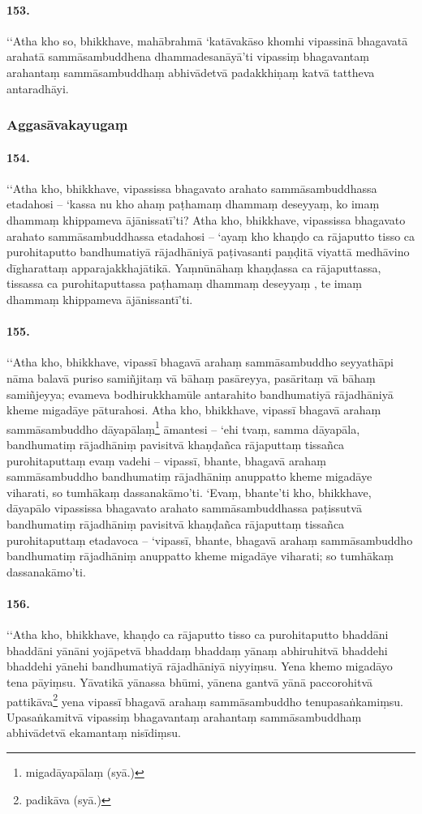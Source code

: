 \paragraph{153.} ‘‘Atha kho so, bhikkhave, mahābrahmā ‘katāvakāso khomhi vipassinā bhagavatā arahatā sammāsambuddhena dhammadesanāyā’ti vipassiṃ bhagavantaṃ arahantaṃ sammāsambuddhaṃ abhivādetvā padakkhiṇaṃ katvā tattheva antaradhāyi.

\subsubsection{Aggasāvakayugaṃ}

\paragraph{154.} ‘‘Atha kho, bhikkhave, vipassissa bhagavato arahato sammāsambuddhassa etadahosi – ‘kassa nu kho ahaṃ paṭhamaṃ dhammaṃ deseyyaṃ, ko imaṃ dhammaṃ khippameva ājānissatī’ti? Atha kho, bhikkhave, vipassissa bhagavato arahato sammāsambuddhassa etadahosi – ‘ayaṃ kho khaṇḍo ca rājaputto tisso ca purohitaputto bandhumatiyā rājadhāniyā paṭivasanti paṇḍitā viyattā medhāvino dīgharattaṃ apparajakkhajātikā. Yaṃnūnāhaṃ khaṇḍassa ca rājaputtassa, tissassa ca purohitaputtassa paṭhamaṃ dhammaṃ deseyyaṃ , te imaṃ dhammaṃ khippameva ājānissantī’ti.

\paragraph{155.} ‘‘Atha kho, bhikkhave, vipassī bhagavā arahaṃ sammāsambuddho seyyathāpi nāma balavā puriso samiñjitaṃ vā bāhaṃ pasāreyya, pasāritaṃ vā bāhaṃ samiñjeyya; evameva bodhirukkhamūle antarahito bandhumatiyā rājadhāniyā kheme migadāye pāturahosi. Atha kho, bhikkhave, vipassī bhagavā arahaṃ sammāsambuddho dāyapālaṃ\footnote{migadāyapālaṃ (syā.)} āmantesi – ‘ehi tvaṃ, samma dāyapāla, bandhumatiṃ rājadhāniṃ pavisitvā khaṇḍañca rājaputtaṃ tissañca purohitaputtaṃ evaṃ vadehi – vipassī, bhante, bhagavā arahaṃ sammāsambuddho bandhumatiṃ rājadhāniṃ anuppatto kheme migadāye viharati, so tumhākaṃ dassanakāmo’ti. ‘Evaṃ, bhante’ti kho, bhikkhave, dāyapālo vipassissa bhagavato arahato sammāsambuddhassa paṭissutvā bandhumatiṃ rājadhāniṃ pavisitvā khaṇḍañca rājaputtaṃ tissañca purohitaputtaṃ etadavoca – ‘vipassī, bhante, bhagavā arahaṃ sammāsambuddho bandhumatiṃ rājadhāniṃ anuppatto kheme migadāye viharati; so tumhākaṃ dassanakāmo’ti.

\paragraph{156.} ‘‘Atha kho, bhikkhave, khaṇḍo ca rājaputto tisso ca purohitaputto bhaddāni bhaddāni yānāni yojāpetvā bhaddaṃ bhaddaṃ yānaṃ abhiruhitvā bhaddehi bhaddehi yānehi bandhumatiyā rājadhāniyā niyyiṃsu. Yena khemo migadāyo tena pāyiṃsu. Yāvatikā yānassa bhūmi, yānena gantvā yānā paccorohitvā pattikāva\footnote{padikāva (syā.)} yena vipassī bhagavā arahaṃ sammāsambuddho tenupasaṅkamiṃsu. Upasaṅkamitvā vipassiṃ bhagavantaṃ arahantaṃ sammāsambuddhaṃ abhivādetvā ekamantaṃ nisīdiṃsu.

